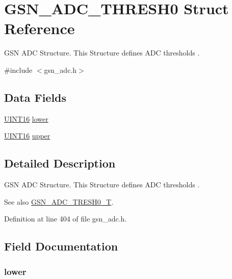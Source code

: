 \hypertarget{a00026}{
\section{GSN\_\-ADC\_\-THRESH0 Struct Reference}
\label{a00026}
}


GSN ADC Structure. This Structure defines ADC thresholds .  




{\ttfamily \#include $<$gsn\_\-adc.h$>$}

\subsection*{Data Fields}
\begin{DoxyCompactItemize}
\item 
\hyperlink{a00660_ga09f1a1fb2293e33483cc8d44aefb1eb1}{UINT16} \hyperlink{a00026_a6345cbda03010ce75421b7d142cd3238}{lower}
\item 
\hyperlink{a00660_ga09f1a1fb2293e33483cc8d44aefb1eb1}{UINT16} \hyperlink{a00026_ac97de50c6b6dd9e9eb57dbf10c38d4ec}{upper}
\end{DoxyCompactItemize}


\subsection{Detailed Description}
GSN ADC Structure. This Structure defines ADC thresholds . 

\begin{DoxySeeAlso}{See also}
\hyperlink{a00643_ga67dc995f7880016f896f0fdf6b61309b}{GSN\_\-ADC\_\-TRESH0\_\-T}. 
\end{DoxySeeAlso}


Definition at line 404 of file gsn\_\-adc.h.



\subsection{Field Documentation}
\hypertarget{a00026_a6345cbda03010ce75421b7d142cd3238}{
\subsubsection[{lower}]{ {\bf lower}}}
\label{a00026_a6345cbda03010ce75421b7d142cd3238}


